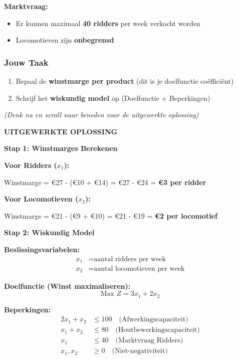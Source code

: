 \documentclass[a4paper,11pt]{article}
\begin{document}
\begin{oefenblok}
    \textbf{Marktvraag:}
    \begin{itemize}
        \item Er kunnen maximaal \textbf{40 ridders} per week verkocht worden
        \item Locomotieven zijn \textbf{onbegrensd}
    \end{itemize}

    \subsubsection*{Jouw Taak}

    \begin{enumerate}
        \item Bepaal de \textbf{winstmarge per product} (dit is je doelfunctie coëfficiënt)
        \item Schrijf het \textbf{wiskundig model} op (Doelfunctie + Beperkingen)
    \end{enumerate}

    \vspace{0.3cm}
    \textit{(Denk na en scroll naar beneden voor de uitgewerkte oplossing)}



    \textbf{UITGEWERKTE OPLOSSING}

    \textbf{Stap 1: Winstmarges Berekenen}

    \textbf{Voor Ridders ($x_1$):}

    Winstmarge = €27 - (€10 + €14) = €27 - €24 = \textbf{€3 per ridder}

    \textbf{Voor Locomotieven ($x_2$):}

    Winstmarge = €21 - (€9 + €10) = €21 - €19 = \textbf{€2 per locomotief}

    \textbf{Stap 2: Wiskundig Model}

    \textbf{Beslissingsvariabelen:}
    \begin{align*}
        x_1 & = \text{aantal ridders per week}      \\
        x_2 & = \text{aantal locomotieven per week}
    \end{align*}

    \textbf{Doelfunctie (Winst maximaliseren):}
    \[
        \text{Max } Z = 3x_1 + 2x_2
    \]

    \textbf{Beperkingen:}
    \begin{align}
        2x_1 + x_2 & \leq 100 \quad \text{(Afwerkingscapaciteit)}    \\
        x_1 + x_2  & \leq 80 \quad \text{(Houtbewerkingscapaciteit)} \\
        x_1        & \leq 40 \quad \text{(Marktvraag Ridders)}       \\
        x_1, x_2   & \geq 0 \quad \text{(Niet-negativiteit)}
    \end{align}


\end{oefenblok}
\end{document}
